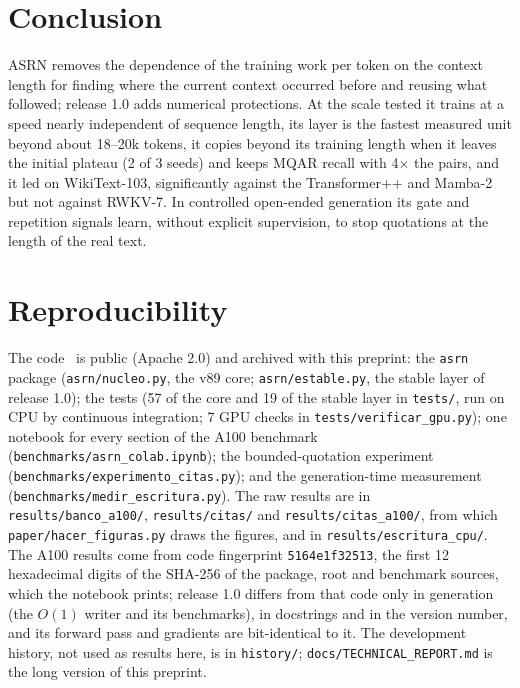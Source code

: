 \documentclass[11pt]{article}
\begin{document}
\section{Conclusion}

ASRN removes the dependence of the training work per token on the context length for finding where the current context
occurred before and reusing what followed; release 1.0 adds numerical protections. At the scale tested it trains at a
speed nearly independent of sequence length, its layer is the fastest measured unit beyond about 18--20k tokens, it
copies beyond its training length when it leaves the initial plateau (2 of 3 seeds) and keeps MQAR recall with
4$\times$ the pairs, and it led on WikiText-103, significantly against the Transformer++ and Mamba-2 but not against
RWKV-7. In controlled open-ended generation its gate and repetition signals learn, without explicit supervision, to stop
quotations at the length of the real text.

\section*{Reproducibility}
The code~\cite{calvario2026asrncode} is public (Apache 2.0) and archived with this preprint:
the \texttt{asrn} package (\nolinkurl{asrn/nucleo.py}, the v89 core; \nolinkurl{asrn/estable.py}, the stable layer of
release 1.0); the tests (57 of the core and 19 of the stable layer in \nolinkurl{tests/}, run on CPU by continuous
integration; 7 GPU checks in \nolinkurl{tests/verificar_gpu.py}); one notebook for every section of the A100 benchmark
(\nolinkurl{benchmarks/asrn_colab.ipynb}); the bounded-quotation experiment
(\nolinkurl{benchmarks/experimento_citas.py}); and the generation-time measurement
(\nolinkurl{benchmarks/medir_escritura.py}). The raw results are in \nolinkurl{results/banco_a100/},
\nolinkurl{results/citas/} and \nolinkurl{results/citas_a100/}, from which \nolinkurl{paper/hacer_figuras.py} draws the
figures, and in \nolinkurl{results/escritura_cpu/}. The A100 results come from code fingerprint \texttt{5164e1f32513},
the first 12 hexadecimal digits of the SHA-256 of the package, root and benchmark sources, which the notebook prints;
release 1.0 differs from that code only in generation (the $O(1)$ writer and its benchmarks), in docstrings and in the
version number, and
its forward pass and gradients are bit-identical to it. The development history, not used as results here, is in
\nolinkurl{history/}; \nolinkurl{docs/TECHNICAL_REPORT.md} is the long version of this preprint.
\end{document}
